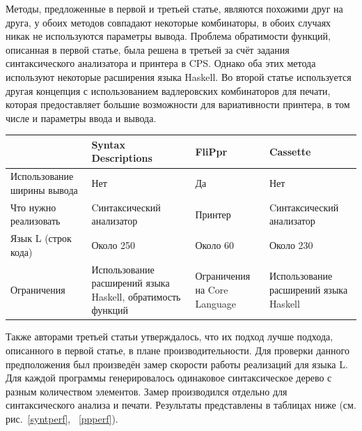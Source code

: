Методы, предложенные в первой и третьей статье, являются похожими друг на друга, 
у обоих методов совпадают некоторые комбинаторы, в обоих случаях никак не 
используются параметры вывода. Проблема обратимости функций, описанная в первой
статье, была решена в третьей за счёт задания синтаксического анализатора и принтера в CPS. 
Однако оба этих метода используют некоторые расширения языка Haskell. Во второй статье 
используется другая концепция с использованием вадлеровских комбинаторов для печати,
которая предоставляет большие возможности для вариативности принтера, в том числе и 
параметры ввода и вывода.

\begin{center}
  \begin{tabular}{ | p{2.5cm} | p{2.5cm} | p{2.5cm} | p{2.5cm} |}
  \hline
                              & Syntax Descriptions                                         & FliPpr                       & Cassette                              \\ \hline
  Использование ширины вывода & Нет                                                         & Да                           & Нет                                   \\ \hline
  Что нужно реализовать       & Cинтаксичес\-кий анализатор                                 & Принтер                      & Cинтаксичес\-кий анализатор           \\ \hline
  Язык L (строк кода)         & Около 250                                                   & Около 60                     & Около 230                             \\ \hline
  Ограничения                 & Использование расширений языка Haskell, обратимость функций & Ограничения на Core Language & Использование расширений языка Haskell\\
  \hline
  \end{tabular}
\end{center}

Также авторами третьей статьи утверждалось, что их подход лучше подхода, описанного в первой статье, 
в плане производительности. Для проверки данного предположения был произведён замер скорости 
работы реализаций для языка L. Для каждой программы генерировалось одинаковое синтаксическое 
дерево с разным количеством элементов. Замер производился отдельно для синтаксического анализа и 
печати. Результаты представлены в таблицах ниже (см. рис.~\ref{syntperf}, ~\ref{ppperf}).

